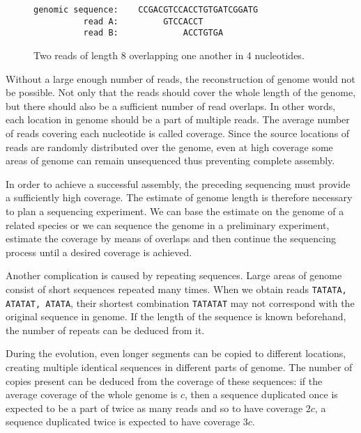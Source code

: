 \begin{figure}[h]
\centering
\begin{varwidth}{\linewidth}
\begin{verbatim}
genomic sequence:    CCGACGTCCACCTGTGATCGGATG
          read A:         GTCCACCT
          read B:             ACCTGTGA
\end{verbatim}
\end{varwidth}
\caption[Two overlapping reads]{Two reads of length 8 overlapping one another in 4 nucleotides.}
\label{fig:overlapping-reads}
\end{figure}

Without a large enough number of reads, the reconstruction of genome would not be possible.
Not only that the reads should cover the whole length of the genome, but there should also be a sufficient number of read overlaps.
In other words, each location in genome should be a part of multiple reads. The average number of reads covering each nucleotide
is called coverage. Since the source locations of reads are randomly distributed over the genome, even at high coverage some areas
of genome can remain unsequenced thus preventing complete assembly.

In order to achieve a successful assembly, the preceding sequencing must provide a sufficiently high coverage.
The estimate of genome length is therefore necessary to plan a sequencing experiment. We can base the
estimate on the genome of a related species or we can sequence the genome in a preliminary experiment,
estimate the coverage by means of overlaps and then continue the sequencing process until a desired coverage is achieved.

\medskip

Another complication is caused by repeating sequences. Large areas of genome consist of short sequences repeated many times.
When we obtain reads \texttt{TATATA, ATATAT, ATATA}, their shortest combination \texttt{TATATAT} may not correspond with the original sequence in genome.
If the length of the sequence is known beforehand, the number of repeats can be deduced from it.

During the evolution, even longer segments can be copied to different locations, 
creating multiple identical sequences in different parts of genome. The number of copies present 
can be deduced from the coverage of these sequences: if the average coverage of the whole genome 
is $c$, then a sequence duplicated once is expected to be a part of twice as many reads and so to
have coverage $2c$, a sequence duplicated twice is expected to have coverage $3c$.


